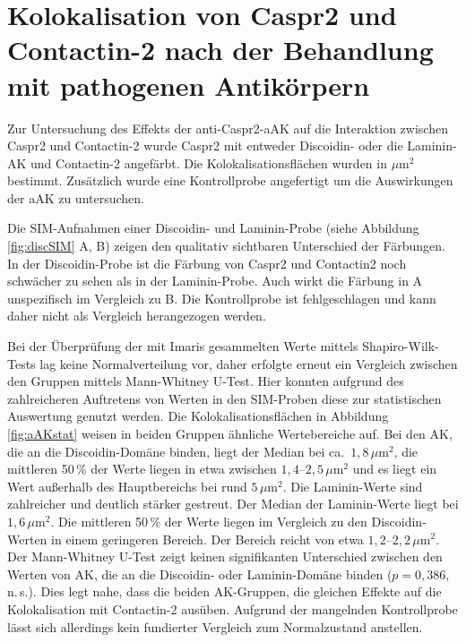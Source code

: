 \section{Kolokalisation von Caspr2 und Contactin-2 nach der
	Behandlung mit pathogenen Antikörpern}

Zur Untersuchung des Effekts der anti-Caspr2-aAK auf die Interaktion
zwischen Caspr2 und Contactin-2 wurde Caspr2 mit entweder Discoidin- oder die Laminin-AK und Contactin-2 angefärbt. Die Kolokalisationsflächen wurden in $\mu\text{m}^2$ bestimmt.
Zusätzlich wurde eine Kontrollprobe angefertigt um die Auswirkungen der aAK zu untersuchen.

Die SIM-Aufnahmen einer Discoidin- und Laminin-Probe (siehe Abbildung \ref{fig:discSIM} A, B) zeigen den qualitativ sichtbaren Unterschied der Färbungen. In der Discoidin-Probe ist die Färbung von Caspr2 und Contactin2 noch schwächer zu sehen als in der Laminin-Probe. Auch wirkt die Färbung in A unspezifisch im Vergleich zu B. Die Kontrollprobe ist fehlgeschlagen und kann daher nicht als Vergleich herangezogen werden.

Bei der Überprüfung der mit Imaris gesammelten Werte mittels Shapiro-Wilk-Tests lag keine
Normalverteilung vor, daher erfolgte erneut ein Vergleich zwischen den Gruppen mittels Mann-Whitney U-Test. Hier konnten aufgrund des zahlreicheren Auftretens von Werten in den SIM-Proben diese zur statistischen Auswertung genutzt werden.
Die Kolokalisationsflächen in Abbildung \ref{fig:aAKstat} weisen in beiden Gruppen ähnliche Wertebereiche auf. Bei den AK, die an die Discoidin-Domäne
binden, liegt der Median bei ca.\ $1{,}8\,\mu\text{m}^2$, die mittleren
50\,\% der Werte liegen in etwa zwischen
$1{,}4$--$2{,}5\,\mu\text{m}^2$ und es liegt ein Wert außerhalb des
Hauptbereichs bei rund $5\,\mu\text{m}^2$.
Die Laminin-Werte sind zahlreicher und deutlich stärker gestreut. %
Der Median der Laminin-Werte liegt bei
$1{,}6\,\mu\text{m}^2$. Die mittleren 50\,\% der Werte liegen im
Vergleich zu den Discoidin-Werten in einem geringeren Bereich. Der
Bereich reicht von etwa $1{,}2$--$2{,}2\,\mu\text{m}^2$.
Der Mann-Whitney U-Test zeigt keinen signifikanten Unterschied zwischen den Werten von AK, die an die Discoidin- oder Laminin-Domäne binden ($p = 0{,}386$, n.\,s.). Dies legt nahe, dass die beiden AK-Gruppen, die gleichen Effekte auf die Kolokalisation mit Contactin-2 ausüben. Aufgrund der mangelnden Kontrollprobe lässt sich allerdings kein fundierter Vergleich zum Normalzustand anstellen.






